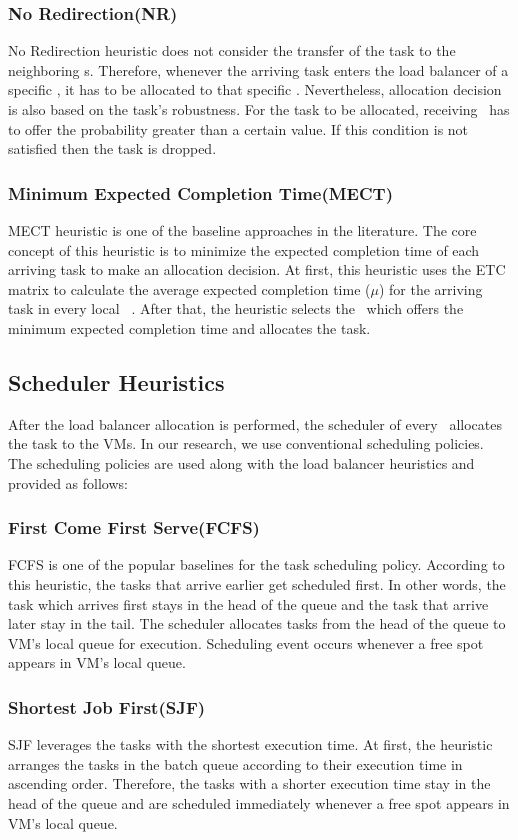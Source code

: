 \subsubsection{No Redirection(NR)}
No Redirection heuristic does not consider the transfer of the task to the neighboring \bs s. Therefore, whenever the arriving task enters the load balancer of a specific \bs, it has to be allocated to that specific \bs. Nevertheless, allocation decision is also based on the task's robustness. For the task to be allocated, receiving \bs~has to offer the probability greater than a certain value. If this condition is not satisfied then the task is dropped.

\subsubsection{Minimum Expected Completion Time(MECT)}
MECT heuristic is one of the baseline approaches in the literature. The core concept of this heuristic is to minimize the expected completion time of each arriving task to make an allocation decision. At first, this heuristic uses the ETC matrix to calculate the average expected completion time ($\mu$) for the arriving task in every local \bs~. After that, the heuristic selects the \bs~which offers the minimum expected completion time and allocates the task. 

\subsection{\textbf{Scheduler Heuristics}}
After the load balancer allocation is performed, the scheduler of every \bs~allocates the task to the VMs. In our research, we use conventional scheduling policies. The scheduling policies are used along with the load balancer heuristics and provided as follows:\\

\subsubsection{First Come First Serve(FCFS)}
FCFS is one of the popular baselines for the task scheduling policy. According to this heuristic, the tasks that arrive earlier get scheduled first. In other words, the task which arrives first stays in the head of the queue and the task that arrive later stay in the tail. The scheduler allocates tasks from the head of the queue to VM's local queue for execution. Scheduling event occurs whenever a free spot appears in VM's local queue.

\subsubsection{Shortest Job First(SJF)}
SJF leverages the tasks with the shortest execution time. At first, the heuristic arranges the tasks in the batch queue according to their execution time in ascending order. Therefore, the tasks with a shorter execution time stay in the head of the queue and are scheduled immediately whenever a free spot appears in VM's local queue.